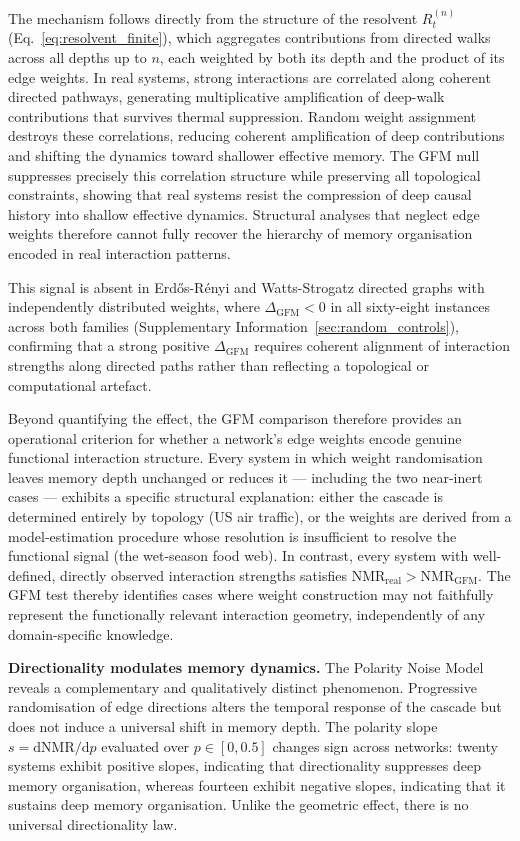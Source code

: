 \documentclass[aps,superscriptaddress,11pt]{revtex4-2}
\newcommand{\NMR}{\mathrm{NMR}}
\newcommand{\Rn}{R^{(n)}_t}
\theoremstyle{definition}
\theoremstyle{plain}
\begin{document}
The mechanism follows directly from the structure of the resolvent
$\Rn$ (Eq.~\ref{eq:resolvent_finite}), which aggregates contributions
from directed walks across all depths up to $n$, each weighted by both
its depth and the product of its edge weights. In real systems, strong
interactions are correlated along coherent directed pathways, generating
multiplicative amplification of deep-walk contributions that survives
thermal suppression. Random weight assignment destroys these correlations,
reducing coherent amplification of deep contributions and shifting the
dynamics toward shallower effective memory. The GFM null suppresses
precisely this correlation structure while preserving all topological
constraints, showing that real systems resist the compression of deep
causal history into shallow effective dynamics. Structural analyses that
neglect edge weights therefore cannot fully recover the hierarchy of
memory organisation encoded in real interaction patterns.

This signal is absent in Erdős-Rényi and Watts-Strogatz directed graphs
with independently distributed weights, where $\Delta_{\mathrm{GFM}} < 0$
in all sixty-eight instances across both families
(Supplementary Information~\ref{sec:random_controls}), confirming that a strong positive
$\Delta_{\mathrm{GFM}}$ requires coherent alignment of interaction
strengths along directed paths rather than reflecting a topological or
computational artefact.

Beyond quantifying the effect, the GFM comparison therefore provides an operational
criterion for whether a network's edge weights encode genuine functional
interaction structure. Every system in which weight randomisation leaves
memory depth unchanged or reduces it --- including the two near-inert
cases --- exhibits a specific structural explanation: either the cascade
is determined entirely by topology (US air traffic), or the weights are
derived from a model-estimation procedure whose resolution is insufficient
to resolve the functional signal (the wet-season food web). In contrast,
every system with well-defined, directly observed interaction strengths
satisfies $\NMR_{\mathrm{real}} > \NMR_{\mathrm{GFM}}$. The GFM test
thereby identifies cases where weight construction may not faithfully
represent the functionally relevant interaction geometry, independently
of any domain-specific knowledge.


\medskip
\noindent
\textbf{Directionality modulates memory dynamics.}
The Polarity Noise Model reveals a complementary and qualitatively distinct
phenomenon. Progressive randomisation of edge directions alters the temporal
response of the cascade but does not induce a universal shift in memory
depth. The polarity slope $s = \mathrm{d}\NMR/\mathrm{d}p$ evaluated over
$p \in [0, 0.5]$ changes sign across networks: twenty systems exhibit
positive slopes, indicating that directionality suppresses deep memory
organisation, whereas fourteen exhibit negative slopes, indicating that it
sustains deep memory organisation. Unlike the geometric effect, there is no
universal directionality law.
\end{document}
